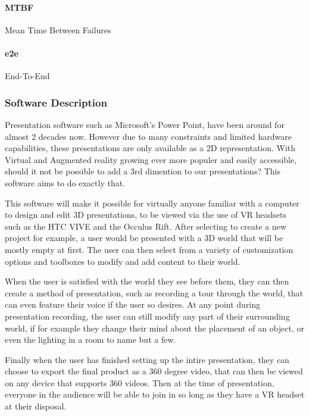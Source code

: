 			\paragraph{MTBF} Mean Time Between Failures
			\paragraph{e2e} End-To-End



	\subsubsection{Software Description}

	Presentation software such as Microsoft’s Power Point, have been around for almost 2 decades now.  However due to many constraints and limited hardware capabilities, these presentations are only available as a 2D representation.  With Virtual and Augmented reality growing ever more populer and easily accessible, should it not be possible to add a 3rd dimention to our presentations?  This software aims to do exactly that.

	This software will make it possible for virtually anyone familiar with a computer to design and edit 3D presentations, to be viewed via the use of VR headsets such as the HTC VIVE and the Occulus Rift.  After selecting to create a new project for example, a user would be presented with a 3D world that will be mostly empty at first.  The user can then select from a variety of customization options and toolboxes to modify and add content to their world.

	When the user is satisfied with the world they see before them, they can then create a method of presentation, such as recording a tour through the world, that can even feature their voice if the user so desires.  At any point during presentation recording, the user can still modify any part of their surrounding world, if for example they change their mind about the placement of an object, or even the lighting in a room to name but a few.

	Finally when the user has finished setting up the intire presentation, they can choose to export the final product as a 360 degree video, that can then be viewed on any device that supports 360 videos.  Then at the time of presentation, everyone in the audience will be able to join in so long as they have a VR headset at their disposal.

